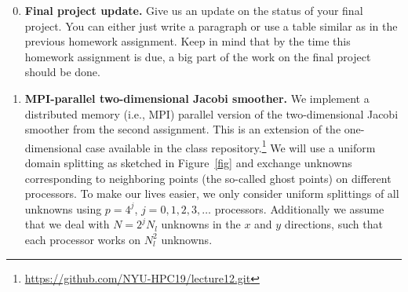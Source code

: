 \documentclass[12pt]{article}
\begin{document}
\begin{enumerate}
\setcounter{enumi}{-1}

  
\item {\bf Final project update.} Give us an update on the status of
  your final project. You can either just write a paragraph or use a
  table similar as in the previous homework assignment. Keep in mind that
  by the time this homework assignment is due, a big part of the work on the final
  project should be done.

\item {\bf MPI-parallel two-dimensional Jacobi smoother.} We implement
  a distributed memory (i.e., MPI) parallel version of the
  two-dimensional Jacobi smoother from the second assignment. This is
  an extension of the one-dimensional case available in the class
  repository.\footnote{\url{https://github.com/NYU-HPC19/lecture12.git}}
  We will use a uniform domain splitting as sketched in
  Figure~\ref{fig} and exchange unknowns corresponding to neighboring
  points (the so-called ghost points) on different processors. To make our lives easier, we only
  consider uniform splittings of all unknowns using $p=4^j$,
  $j=0,1,2,3,\ldots$ processors. Additionally we assume that we deal
  with $N=2^jN_l$ unknowns in the $x$ and $y$ directions, such that
  each processor works on $N_l^2$ unknowns.
  \begin{figure}[bht]\centering
\end{figure}
\end{enumerate}
\end{document}
